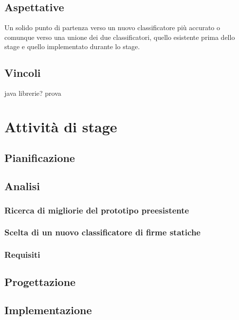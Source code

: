 \subsection{Aspettative}
\label{2.3}
Un solido punto di partenza verso un nuovo classificatore più accurato o comunque verso una unione dei due classificatori, quello esistente prima dello stage e quello implementato durante lo stage.
\subsection{Vincoli}
\label{2.4}
java
librerie?
\gls{prova}

\newpage

\section{Attività di stage}
\label{3.0}

\subsection{Pianificazione}
\label{3.1}

\subsection{Analisi}
\label{3.2}

\subsubsection{Ricerca di migliorie del prototipo preesistente}
\label{3.2.1}

\subsubsection{Scelta di un nuovo classificatore di firme statiche}
\label{3.2.2}

\subsubsection{Requisiti}
\label{3.2.3}

\subsection{Progettazione}
\label{3.3}

\subsection{Implementazione}
\label{3.4}
\newpage

